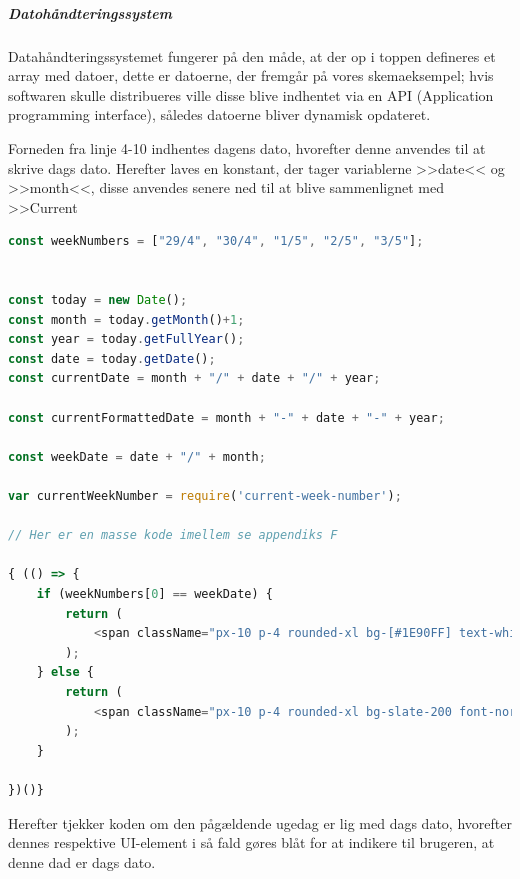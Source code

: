         \subparagraph{Datohåndteringssystem}
        Datahåndteringssystemet fungerer på den måde, at der op i toppen defineres et array med datoer, dette er datoerne, der fremgår på vores skemaeksempel; hvis softwaren skulle distribueres ville disse blive indhentet via en API (Application programming interface), således datoerne bliver dynamisk opdateret.

        Forneden fra linje 4-10 indhentes dagens dato, hvorefter denne anvendes til at skrive dags dato. Herefter laves en konstant, der tager variablerne >>date<< og >>month<<, disse anvendes senere ned til at blive sammenlignet med >>Current 
        \begin{lstlisting}[language=Javascript]
const weekNumbers = ["29/4", "30/4", "1/5", "2/5", "3/5"];


const today = new Date();
const month = today.getMonth()+1;
const year = today.getFullYear();
const date = today.getDate();
const currentDate = month + "/" + date + "/" + year;

const currentFormattedDate = month + "-" + date + "-" + year; 

const weekDate = date + "/" + month;

var currentWeekNumber = require('current-week-number');

// Her er en masse kode imellem se appendiks F

{ (() => {
    if (weekNumbers[0] == weekDate) {
        return (
            <span className="px-10 p-4 rounded-xl bg-[#1E90FF] text-white font-normal">Mandag <strong>{ weekNumbers[0] }</strong></span> 
        );
    } else {
        return (
            <span className="px-10 p-4 rounded-xl bg-slate-200 font-normal">Mandag <strong>{ weekNumbers[0] }</strong></span>
        );
    }

})()}
        \end{lstlisting}
    Herefter tjekker koden om den pågældende ugedag er lig med dags dato, hvorefter dennes respektive UI-element i så fald gøres blåt for at indikere til brugeren, at denne dad er dags dato.
    
